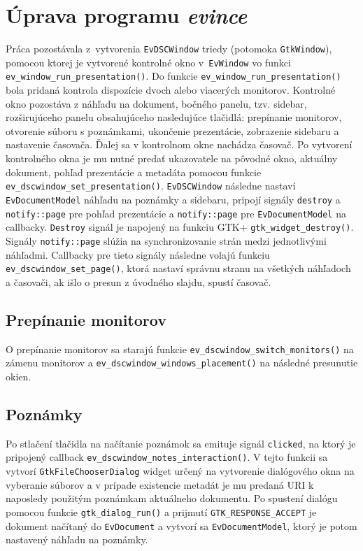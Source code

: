 \documentclass[12pt,oneside,final]{fithesis2}
\begin{document}
\chapter{Úprava programu \emph{evince}}
Práca pozostávala z~vytvorenia \texttt{EvDSCWindow} triedy (potomoka \texttt{GtkWindow}), pomocou ktorej je vytvorené kontrolné okno v~\texttt{EvWindow} vo funkci \texttt{ev\_window\_run\_presentation()}. Do funkcie \texttt{ev\_window\_run\_presentation()} bola pridaná kontrola dispozície dvoch alebo viacerých monitorov. Kontrolné okno pozostáva z náhľadu na dokument, bočného panelu, tzv. sidebar, rozširujúceho panelu obsahujúceho nasledujúce tlačidlá: prepínanie monitorov, otvorenie súboru s poznámkami, ukončenie prezentácie, zobrazenie sidebaru a nastavenie časovača. Ďalej sa v kontrolnom okne nachádza časovač. Po vytvorení kontrolného okna je mu nutné predať ukazovatele na pôvodné okno, aktuálny dokument, pohľad prezentácie a metadáta pomocou funkcie \texttt{ev\_dscwindow\_set\_presentation()}. \texttt{EvDSCWindow} následne nastaví \texttt{EvDocumentModel} náhľadu na poznámky a sidebaru, pripojí signály \texttt{destroy} a \texttt{notify::page} pre pohľad prezentácie a \texttt{notify::page} pre \texttt{EvDocumentModel} na callbacky. \texttt{Destroy} signál je napojený na funkciu GTK+ \texttt{gtk\_widget\_destroy()}. Signály \texttt{notify::page} slúžia na synchronizovanie strán medzi jednotlivými náhľadmi. Callbacky pre tieto signály následne volajú funkciu \texttt{ev\_dscwindow\_set\_page()}, ktorá nastaví správnu stranu na všetkých náhľadoch a časovači, ak išlo o presun z úvodného slajdu, spustí časovač.
\section{Prepínanie monitorov}
O prepínanie monitorov sa starajú funkcie \texttt{ev\_dscwindow\_switch\_monitors()} na zámenu monitorov a \texttt{ev\_dscwindow\_windows\_placement()} na následné presunutie okien. %
\section{Poznámky}
Po stlačení tlačidla na načítanie poznámok sa emituje signál \texttt{clicked}, na ktorý je pripojený callback \texttt{ev\_dscwindow\_notes\_interaction()}. V tejto funkcii sa vytvorí \texttt{GtkFileChooserDialog} widget určený na vytvorenie dialógového okna na vyberanie súborov a v prípade existencie metadát je mu predaná URI k naposledy použitým poznámkam aktuálneho dokumentu. Po spustení dialógu pomocou funkcie \texttt{gtk\_dialog\_run()} a prijmutí \texttt{GTK\_RESPONSE\_ACCEPT} je dokument načítaný do \texttt{EvDocument} a vytvorí sa \texttt{EvDocumentModel}, ktorý je potom nastavený náhľadu na poznámky.
\end{document}
